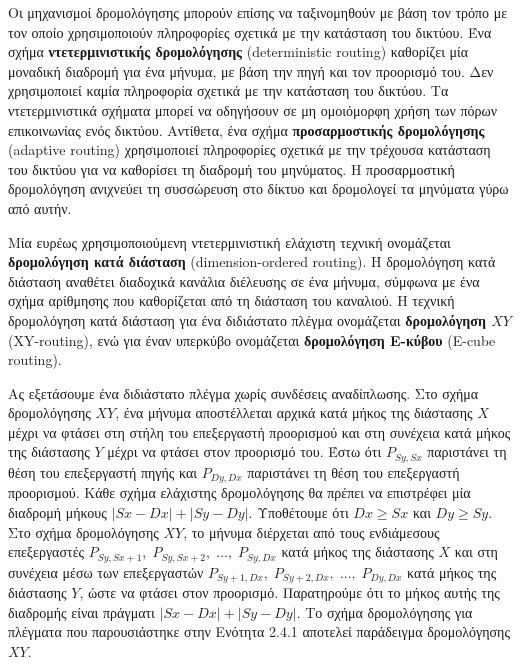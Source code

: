 \documentclass[12pt,a4paper]{article} %
\begin{document}
Οι μηχανισμοί δρομολόγησης μπορούν επίσης να ταξινομηθούν με βάση τον 
τρόπο με τον οποίο χρησιμοποιούν πληροφορίες σχετικά με την κατάσταση του 
δικτύου. Ένα σχήμα \textbf{ντετερμινιστικής δρομολόγησης} 
(deterministic routing) καθορίζει μία μοναδική 
διαδρομή για ένα μήνυμα, με βάση την πηγή και τον προορισμό του. Δεν 
χρησιμοποιεί καμία πληροφορία σχετικά με την κατάσταση του δικτύου.
Τα ντετερμινιστικά σχήματα μπορεί να οδηγήσουν σε μη ομοιόμορφη χρήση των 
πόρων επικοινωνίας ενός δικτύου. Αντίθετα, ένα σχήμα \textbf{προσαρμοστικής δρομολόγησης}
(adaptive routing) χρησιμοποιεί πληροφορίες 
σχετικά με την τρέχουσα κατάσταση του δικτύου για να καθορίσει τη διαδρομή 
του μηνύματος. Η προσαρμοστική δρομολόγηση ανιχνεύει τη συσσώρευση στο 
δίκτυο και δρομολογεί τα μηνύματα γύρω από αυτήν.

Μία ευρέως χρησιμοποιούμενη ντετερμινιστική ελάχιστη τεχνική ονομάζεται
\textbf{δρομολόγηση κατά διάσταση} (dimension-ordered routing). 
Η δρομολόγηση κατά διάσταση αναθέτει διαδοχικά κανάλια διέλευσης σε ένα 
μήνυμα, σύμφωνα με ένα σχήμα αρίθμησης που καθορίζεται από τη διάσταση του 
καναλιού. Η τεχνική δρομολόγηση κατά διάσταση για ένα διδιάστατο πλέγμα
ονομάζεται \textbf{δρομολόγηση $XY$} (XY-routing),
ενώ για έναν υπερκύβο ονομάζεται \textbf{δρομολόγηση E-κύβου} 
(E-cube routing).

Ας εξετάσουμε ένα διδιάστατο πλέγμα χωρίς συνδέσεις αναδίπλωσης. Στο σχήμα
δρομολόγησης $XY$, ένα μήνυμα αποστέλλεται αρχικά κατά μήκος της διάστασης 
$X$ μέχρι να φτάσει στη στήλη του επεξεργαστή προορισμού και στη συνέχεια 
κατά μήκος της διάστασης $Y$ μέχρι να φτάσει στον προορισμό του. Έστω ότι 
$P_{Sy,Sx}$ παριστάνει τη θέση του επεξεργαστή πηγής και $P_{Dy,Dx}$ 
παριστάνει τη θέση του επεξεργαστή προορισμού. Κάθε σχήμα ελάχιστης 
δρομολόγησης θα πρέπει να επιστρέφει μία διαδρομή μήκους 
$|Sx-Dx| + |Sy-Dy|$. Υποθέτουμε ότι $Dx \geq Sx$ και $Dy \geq Sy$.
Στο σχήμα δρομολόγησης $XY$, το μήνυμα διέρχεται από τους ενδιάμεσους 
επεξεργαστές \(P_{Sy,Sx+1},\; P_{Sy,Sx+2},\; \dots,\; P_{Sy,Dx}\)
κατά μήκος της διάστασης $X$ και στη συνέχεια μέσω των επεξεργαστών
\(P_{Sy+1,Dx},\; P_{Sy+2,Dx},\; \dots,\; P_{Dy,Dx}\) κατά μήκος της 
διάστασης $Y$, ώστε να φτάσει στον προορισμό.
Παρατηρούμε ότι το μήκος αυτής της διαδρομής είναι πράγματι
$|Sx-Dx| + |Sy-Dy|$. Το σχήμα δρομολόγησης για πλέγματα που παρουσιάστηκε 
στην Ενότητα 2.4.1 αποτελεί παράδειγμα δρομολόγησης $XY$.
\end{document}
